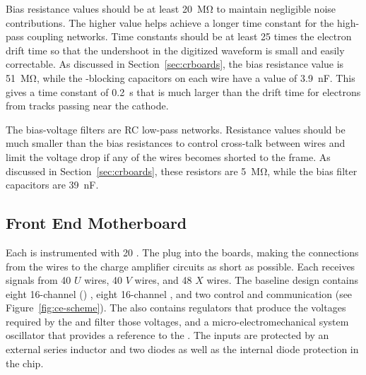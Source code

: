 Bias resistance values should be at least \SI{20}{\mega\ohm} to 
maintain negligible noise contributions. The higher value helps 
achieve a longer time constant for the high-pass coupling networks.
Time constants should be at least \num{25} times the electron 
drift time so that the undershoot in the digitized waveform
is small and easily correctable. %
As discussed in Section~\ref{sec:crboards},
the bias resistance value is \SI{51}{\mega\ohm}, while the 
-blocking capacitors on each wire have a value of
\SI{3.9}{nF}. This gives a time constant of \SI{0.2}{s} that
is much larger than the drift time for electrons from tracks
passing near the cathode.

The bias-voltage filters are RC low-pass networks. Resistance 
values should be much smaller than the bias resistances to control 
cross-talk between wires and limit the voltage drop if any of the 
wires becomes shorted to the  frame. As discussed
in Section~\ref{sec:crboards}, these resistors are 
\SI{5}{\mega\ohm}, while the bias filter capacitors are \SI{39}{nF}.

\subsection{Front End Motherboard}
\label{sec:fdsp-tpcelec-design-femb}

Each  is instrumented with \num{20} .
The  plug into the   boards, 
making the connections from the wires to the charge amplifier 
circuits as short as possible. Each  receives signals 
from \num{40} $U$ wires, \num{40} $V$ wires, and \num{48} $X$ wires.
The baseline  design contains eight \num{16}-channel 
 () , eight \num{16}-channel 
 , and two  control and 
communication  (see Figure~\ref{fig:ce-scheme}).
The  also contains regulators that produce the voltages 
required by the  and filter those voltages, and 
a micro-electromechanical system oscillator that provides
a reference to the  . The  
inputs are protected by an external series inductor and two 
diodes as well as the internal diode protection in the chip.

